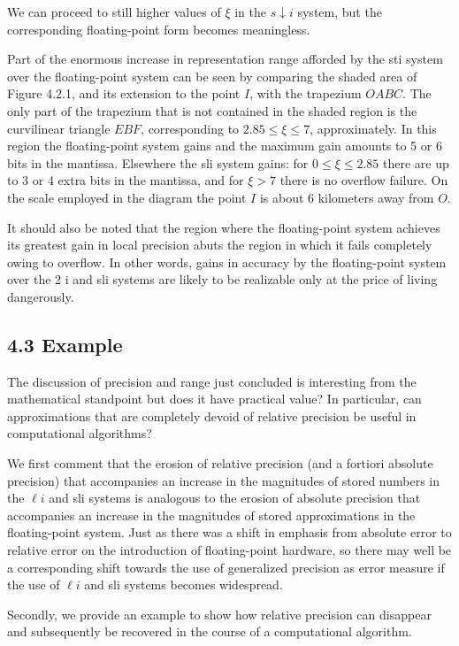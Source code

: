 \documentclass[10pt]{article}
\begin{document}
We can proceed to still higher values of $\xi$ in the $s \downarrow i$ system, but the corresponding floating-point form becomes meaningless.

Part of the enormous increase in representation range afforded by the sti system over the floating-point system can be seen by comparing the shaded area of Figure 4.2.1, and its extension to the point $I$, with the trapezium $O A B C$. The only part of the trapezium that is not contained in the shaded region is the curvilinear triangle $E B F$, corresponding to $2.85 \leqslant \xi \leqslant 7$, approximately. In this region the floating-point system gains and the maximum gain amounts to 5 or 6 bits in the mantissa. Elsewhere the sli system gains: for $0 \leqslant \xi \leqslant 2.85$ there are up to 3 or 4 extra bits in the mantissa, and for $\xi>7$ there is no overflow failure. On the scale employed in the diagram the point $I$ is about 6 kilometers away from $O$.

It should also be noted that the region where the floating-point system achieves its greatest gain in local precision abuts the region in which it fails completely owing to overflow. In other words, gains in accuracy by the floating-point system over the 2 i and sli systems are likely to be realizable only at the price of living dangerously.

\subsection*{4.3 Example}
The discussion of precision and range just concluded is interesting from the mathematical standpoint but does it have practical value? In particular, can approximations that are completely devoid of relative precision be useful in computational algorithms?

We first comment that the erosion of relative precision (and a fortiori absolute precision) that accompanies an increase in the magnitudes of stored numbers in the $\ell i$ and sli systems is analogous to the erosion of absolute precision that accompanies an increase in the magnitudes of stored approximations in the floating-point system. Just as there was a shift in emphasis from absolute error to relative error on the introduction of floating-point hardware, so there may well be a corresponding shift towards the use of generalized precision as error measure if the use of $\ell i$ and sli systems becomes widespread.

Secondly, we provide an example to show how relative precision can disappear and subsequently be recovered in the course of a computational algorithm.
\end{document}
